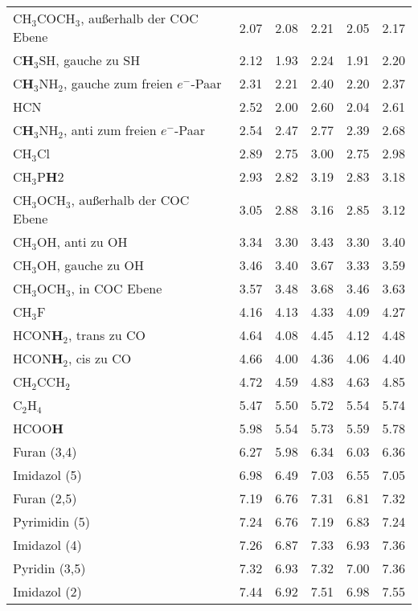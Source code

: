 \begin{table}[ht!]
{\begin{tabular}{lc|cc|cc}
    CH$_{3}$COCH$_{3}$, außerhalb der COC Ebene & 2.07  & 2.08  & 2.21  & 2.05  & 2.17 \\
    C\textbf{H}$_{3}$SH, gauche zu SH & 2.12  & 1.93  & 2.24  & 1.91  & 2.20 \\
    C\textbf{H}$_{3}$NH$_{2}$, gauche zum freien $e^-$-Paar & 2.31  & 2.21  & 2.40   & 2.20   & 2.37 \\
    HCN   & 2.52  & 2.00     & 2.60   & 2.04  & 2.61 \\
    C\textbf{H}$_{3}$NH$_{2}$, anti zum freien $e^-$-Paar & 2.54  & 2.47  & 2.77  & 2.39  & 2.68 \\
    CH$_{3}$Cl & 2.89  & 2.75  & 3.00     & 2.75  & 2.98 \\
    CH$_{3}$P\textbf{H}2 & 2.93  & 2.82  & 3.19  & 2.83  & 3.18 \\
    CH$_{3}$OCH$_{3}$, außerhalb der COC Ebene & 3.05  & 2.88  & 3.16  & 2.85  & 3.12 \\
    CH$_{3}$OH, anti zu OH & 3.34  & 3.30   & 3.43  & 3.30   & 3.40 \\
    CH$_{3}$OH, gauche zu OH & 3.46  & 3.40   & 3.67  & 3.33  & 3.59 \\
    CH$_{3}$OCH$_{3}$, in COC Ebene & 3.57  & 3.48  & 3.68  & 3.46  & 3.63 \\
    CH$_{3}$F  & 4.16  & 4.13  & 4.33  & 4.09  & 4.27 \\
    HCON\textbf{H}$_{2}$, trans zu CO & 4.64  & 4.08  & 4.45  & 4.12  & 4.48 \\
    HCON\textbf{H}$_{2}$, cis zu CO & 4.66  & 4.00     & 4.36  & 4.06  & 4.40 \\
    CH$_{2}$CCH$_{2}$ & 4.72  & 4.59  & 4.83  & 4.63  & 4.85 \\
    C$_{2}$H$_{4}$  & 5.47  & 5.50   & 5.72  & 5.54  & 5.74 \\
    HCOO\textbf{H} & 5.98  & 5.54  & 5.73  & 5.59  & 5.78 \\
    Furan (3,4) & 6.27  & 5.98  & 6.34  & 6.03  & 6.36 \\
    Imidazol (5) & 6.98  & 6.49  & 7.03  & 6.55  & 7.05 \\
    Furan (2,5) & 7.19  & 6.76  & 7.31  & 6.81  & 7.32 \\
    Pyrimidin (5) & 7.24  & 6.76  & 7.19  & 6.83  & 7.24 \\
    Imidazol (4) & 7.26  & 6.87  & 7.33  & 6.93  & 7.36 \\
    Pyridin (3,5) & 7.32  & 6.93  & 7.32  & 7.00 & 7.36 \\
    Imidazol (2) & 7.44  & 6.92  & 7.51  & 6.98  & 7.55 \\

\end{tabular}}
\end{table}
